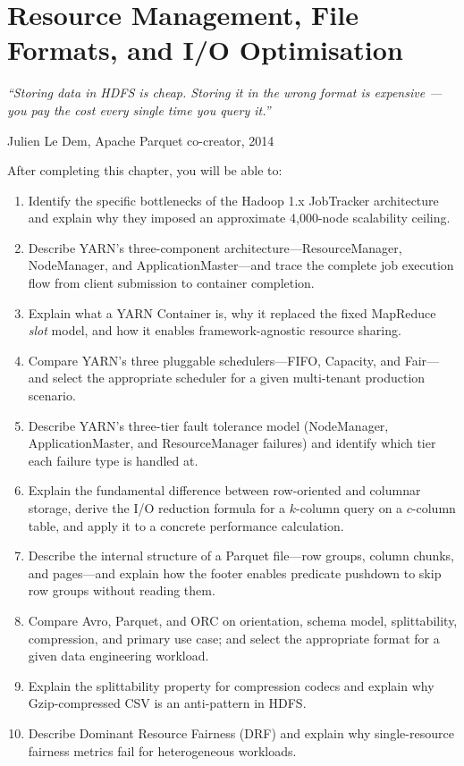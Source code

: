 
\chapter{Resource Management, File Formats, and I/O Optimisation}
\label{ch:yarn-formats}

\epigraph{\textit{``Storing data in HDFS is cheap. Storing it in the wrong format
is expensive --- you pay the cost every single time you query it.''}}{Julien Le Dem, Apache Parquet co-creator, 2014}

\vspace{4pt}

\begin{chapterlearning}
After completing this chapter, you will be able to:
\begin{enumerate}
  \item Identify the specific bottlenecks of the Hadoop 1.x JobTracker
        architecture and explain why they imposed an approximate
        4{,}000-node scalability ceiling.
  \item Describe YARN's three-component architecture---Resource\-Manager,
        NodeManager, and ApplicationMaster---and trace the complete
        job execution flow from client submission to container completion.
  \item Explain what a YARN Container is, why it replaced the fixed
        MapReduce \emph{slot} model, and how it enables framework-agnostic
        resource sharing.
  \item Compare YARN's three pluggable schedulers---FIFO, Capacity, and
        Fair---and select the appropriate scheduler for a given
        multi-tenant production scenario.
  \item Describe YARN's three-tier fault tolerance model (NodeManager,
        ApplicationMaster, and ResourceManager failures) and identify
        which tier each failure type is handled at.
  \item Explain the fundamental difference between row-oriented and
        columnar storage, derive the I/O reduction formula for a
        $k$-column query on a $c$-column table, and apply it to a
        concrete performance calculation.
  \item Describe the internal structure of a Parquet file---row groups,
        column chunks, and pages---and explain how the footer enables
        predicate pushdown to skip row groups without reading them.
  \item Compare Avro, Parquet, and ORC on orientation, schema model,
        splittability, compression, and primary use case; and select
        the appropriate format for a given data engineering workload.
  \item Explain the splittability property for compression codecs and
        explain why Gzip-compressed CSV is an anti-pattern in HDFS.
  \item Describe Dominant Resource Fairness (DRF) and explain why
        single-resource fairness metrics fail for heterogeneous workloads.
\end{enumerate}
\end{chapterlearning}

